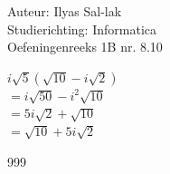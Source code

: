 \documentclass[a4paper]{article}
\begin{document}
\noindent \large Auteur: Ilyas Sal-lak \\
\noindent \large Studierichting: Informatica\\
\noindent \large Oefeningenreeks 1B nr. 8.10\\

\medskip

\normalsize

$i\sqrt{5} \left(\sqrt{10} - i\sqrt{2}\right)$ \\

$= i\sqrt{50} - i^2 \sqrt{10}$ \\

$= 5i\sqrt{2} + \sqrt{10}$ \\

$= \sqrt{10} + 5i\sqrt{2}$



\begin{thebibliography}{999}
\end{thebibliography}
\end{document}

